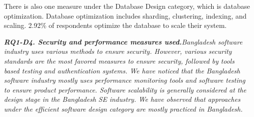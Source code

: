 There is also one measure under the Database Design category, which is database optimization. Database optimization includes sharding, clustering, indexing, and scaling. 2.92\% of respondents optimize the database to scale their system.
\begin{tcolorbox}[flushleft upper,boxrule=1pt,arc=0pt,left=0pt,right=0pt,top=0pt,bottom=0pt,colback=white,after=\ignorespacesafterend\par\noindent]

\nd\it{\bf{RQ1-D4. Security and performance measures used.}}Bangladesh software industry uses various methods to ensure security. However, various security standards are the most favored measures to ensure security, followed by tools based testing and authentication systems. We have noticed that the Bangladesh software industry mostly uses performance monitoring tools and software testing to ensure product performance. Software scalability is generally considered at the design stage in the Bangladesh SE industry. We have observed that approaches under the efficient software design category are mostly practiced in Bangladesh.


\end{tcolorbox}